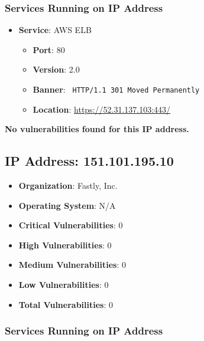 \documentclass{article}
\begin{document}
\subsubsection*{Services Running on IP Address}

\begin{itemize}
    
        \item \textbf{Service}: AWS ELB
        \begin{itemize}
            \item \textbf{Port}: 80
            \item \textbf{Version}:  2.0 
            \item \textbf{Banner}: \texttt{
                HTTP/1.1 301 Moved Permanently
            }
            \item \textbf{Location}: \href{ https://52.31.137.103:443/ }{ https://52.31.137.103:443/ }
        \end{itemize}
    
\end{itemize}


\textbf{No vulnerabilities found for this IP address.}




\clearpage



\subsection*{IP Address: 151.101.195.10}

\begin{itemize}
    \item \textbf{Organization}: Fastly, Inc.
    \item \textbf{Operating System}:  N/A 
    \item \textbf{Critical Vulnerabilities}: 0
    \item \textbf{High Vulnerabilities}: 0
    \item \textbf{Medium Vulnerabilities}: 0
    \item \textbf{Low Vulnerabilities}: 0
    \item \textbf{Total Vulnerabilities}: 0
\end{itemize}

\subsubsection*{Services Running on IP Address}
\end{document}

